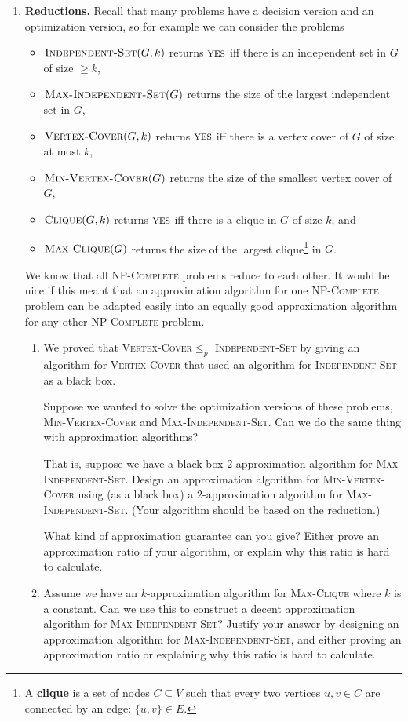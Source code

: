 \documentclass[11pt]{article}
\newcommand{\yes}{\textsc{yes}\xspace}
\newcommand{\prob}[1]{\textsc{#1}\xspace}
\newcommand{\vc}{\prob{Vertex-Cover}}
\newcommand{\vcopt}{\prob{Min-Vertex-Cover}}
\newcommand{\is}{\prob{Independent-Set}}
\newcommand{\isopt}{\prob{Max-Independent-Set}}
\newcommand{\clique}{\prob{Clique}}
\newcommand{\cliqueopt}{\prob{Max-Clique}}
\newcommand{\npcomplete}{\textsc{NP-Complete}\xspace}
\begin{document}
\begin{enumerate}
\item {\bf Reductions.}
  Recall that many problems have a decision version and an
  optimization version, so for example we can consider the problems
  \begin{itemize}
    \item $\is(G,k)$ returns $\yes$ iff there is an independent set in $G$ of
      size $\geq k$,
    \item $\isopt(G)$ returns the size of the largest independent set in
      $G$, 
    \item $\vc(G,k)$ returns $\yes$ iff there is a vertex cover of $G$ of size
      at most $k$, 
    \item $\vcopt(G)$ returns the size of the smallest vertex
      cover of $G$,
    \item $\clique(G,k)$ returns $\yes$ iff there is a clique in $G$
      of size $k$, and
    \item $\cliqueopt(G)$ returns the size of the largest
      clique\footnote{A {\bf clique} is a set of nodes $C \subseteq V$
        such that every two vertices $u, v \in C$ are connected by an
        edge: $\{u,v\} \in E$.} in $G$.
  \end{itemize}

  We know that all \npcomplete problems reduce to each other. It would
  be nice if this meant that an approximation algorithm for one
  \npcomplete problem can be adapted easily into an equally good
  approximation algorithm for any other \npcomplete problem.
  
  \begin{enumerate}
  \item We proved that \vc $\leq_p$ \is by giving an
    algorithm for \vc that used an algorithm for \is as a black box.

    Suppose we wanted to solve the optimization versions of these
    problems, \vcopt and \isopt.
    Can we do the same thing with approximation algorithms?

    That is, suppose we have a black box $2$-approximation algorithm
    for \isopt. 
    Design an approximation algorithm for \vcopt
    using (as a black box) a $2$-approximation algorithm for \isopt.
    (Your algorithm should be based on the reduction.)

    What kind of approximation guarantee can you give?
    Either prove an approximation ratio of your algorithm, or explain
    why this ratio is hard to calculate.

  \item Assume we have an $k$-approximation algorithm for \cliqueopt
    where $k$ is a constant.  Can we use this to
    construct a decent approximation algorithm for \isopt?
    Justify your answer by designing an
    approximation algorithm for \isopt, and either proving an
    approximation ratio or explaining why this ratio is hard to
    calculate.
  \end{enumerate}
  

\end{enumerate}
\end{document}
